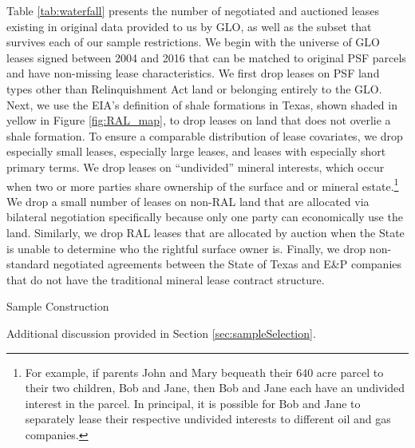 \documentclass[12pt]{article}
\begin{document}
\begin{appendices}
Table \ref{tab:waterfall} presents the number of negotiated and auctioned leases existing in original data provided to us by GLO, as well as the subset that survives each of our sample restrictions. We begin with the universe of GLO leases signed between 2004 and 2016 that can be matched to original PSF parcels and have non-missing lease characteristics.  We first drop leases on PSF land types other than Relinquishment Act land or belonging entirely to the GLO.  Next, we use the EIA's definition of shale formations in Texas, shown shaded in yellow in Figure \ref{fig:RAL_map}, to drop leases on land that does not overlie a shale formation.  To ensure a comparable distribution of lease covariates, we drop especially small leases, especially large leases, and leases with especially short primary terms.  We drop leases on ``undivided'' mineral interests, which occur when two or more parties share ownership of the surface and or mineral estate.\footnote{For example, if parents John and Mary bequeath their 640 acre parcel to their two children, Bob and Jane, then Bob and Jane each have an undivided interest in the parcel.  In principal, it is possible for Bob and Jane to separately lease their respective undivided interests to different oil and gas companies.} We drop a small number of leases on non-RAL land that are allocated via bilateral negotiation specifically because only one party can economically use the land.   Similarly, we drop RAL leases that are allocated by auction when the State is unable to determine who the rightful surface owner is.  Finally, we drop non-standard negotiated agreements between the State of Texas and E\&P companies that do not have the traditional mineral lease contract structure.

\begin{table}[H]
	\begin{center}
	\begin{threeparttable}
		\caption{Sample Construction}
		\label{tab:waterfall}
		\small
		            
		\footnotesize
		\begin{tablenotes}
			\item Additional discussion provided in Section \ref{sec:sampleSelection}.
		\end{tablenotes}
	\end{threeparttable}
	\end{center}
\end{table}


\end{appendices}
\end{document}
